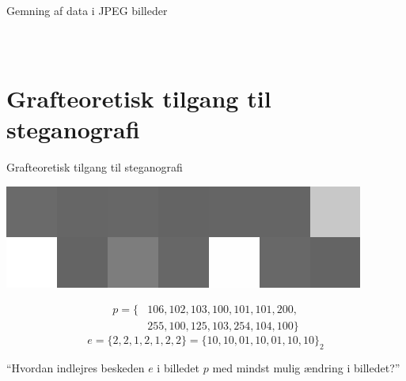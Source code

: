 \begin{frame}{Gemning af data i JPEG billeder}{}
\begin{minipage}[0.5\textheight]{\textwidth}
\begin{columns}[T]
\begin{column}{0.5\textwidth}
{\begin{table}[]
\begin{tabular}{|c|c|c|c|c|c|c|c|}
						\end{tabular}
					\end{table}
				}
			\end{column}
		\end{columns}
	\end{minipage}
	
\end{frame}

\section{Grafteoretisk tilgang til steganografi}
\begin{frame}{Grafteoretisk tilgang til steganografi}{}
	\begin{center}
		\includegraphics[width=.4\textwidth, frame]{figures/pixelgrid.png}
	\end{center}
	\begin{align*}
		p = \{&106,102,103,100,101,101,200,\\&255,100,125,103,254,104,100\}
	\end{align*}
	$$ e = \{2,2,1,2,1,2,2\} = \{10,10,01,10,01,10,10\}_2$$
	
	``Hvordan indlejres beskeden $e$ i billedet $p$ med mindst mulig ændring i billedet?''
\end{frame}

